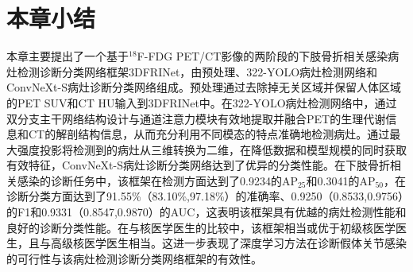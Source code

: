 \section{本章小结}

本章主要提出了一个基于\(^{18}\)F-FDG PET/CT影像的两阶段的下肢骨折相关感染病灶检测诊断分类网络框架3DFRINet，由预处理、322-YOLO病灶检测网络和ConvNeXt-S病灶诊断分类网络组成。预处理通过去除掉无关区域并保留人体区域的PET SUV和CT HU输入到3DFRINet中。在322-YOLO病灶检测网络中，通过双分支主干网络结构设计与通道注意力模块有效地提取并融合PET的生理代谢信息和CT的解剖结构信息，从而充分利用不同模态的特点准确地检测病灶。通过最大强度投影将检测到的病灶从三维转换为二维，在降低数据和模型规模的同时获取有效特征，ConvNeXt-S病灶诊断分类网络达到了优异的分类性能。在下肢骨折相关感染的诊断任务中，该框架在检测方面达到了0.9234的AP\(_{25}\)和0.3041的AP\(_{50}\)，在诊断分类方面达到了91.55\%（83.10\%,97.18\%）的准确率、0.9250（0.8533,0.9756）的F1和0.9331（0.8547,0.9870）的AUC，这表明该框架具有优越的病灶检测性能和良好的诊断分类性能。在与核医学医生的比较中，该框架相当或优于初级核医学医生，且与高级核医学医生相当。这进一步表现了深度学习方法在诊断假体关节感染的可行性与该病灶检测诊断分类网络框架的有效性。